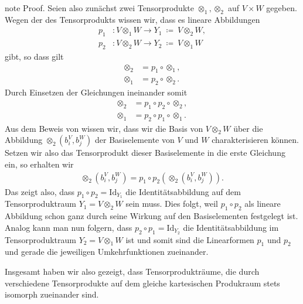 \documentclass[letterpaper,10pt,german]{jupyterBook}
\begin{document}
\begin{sphinxadmonition}{note}
\sphinxAtStartPar
Proof. Seien also zunächst zwei Tensorprodukte \(\otimes_1, \otimes_2\) auf \(V\times W\) gegeben.
Wegen der  des Tensorprodukts wissen wir, dass es lineare Abbildungen
\begin{equation*}
\begin{split}p_1&: V\otimes_1 W\to Y_1 \ \coloneqq \ V\otimes_2 W,\\
p_2&: V\otimes_2 W\to Y_2 \ \coloneqq \ V\otimes_1 W\end{split}
\end{equation*}
\sphinxAtStartPar
gibt, so dass gilt
\begin{equation*}
\begin{split}\otimes_2 &= p_1 \circ \otimes_1,\\
\otimes_1 &= p_2 \circ \otimes_2.\end{split}
\end{equation*}
\sphinxAtStartPar
Durch Einsetzen der Gleichungen ineinander somit
\begin{equation*}
\begin{split}\otimes_2 &= p_1\circ p_2 \circ \otimes_2,\\
\otimes_1 &= p_2\circ p_1 \circ \otimes_1.\end{split}
\end{equation*}
\sphinxAtStartPar
Aus dem Beweis von {\hyperref[\detokenize{vektoranalysis/tensor:thm:existenzTensorprodukt}]{}} wissen wir, dass wir die Basis von \(V\otimes_2 W\) über die Abbildung \(\otimes_2(b_i^V, b_j^W)\) der Basiselemente von \(V\) und \(W\) charakterisieren können.
Setzen wir also das Tensorprodukt dieser Basiselemente in die erste Gleichung ein, so erhalten wir
\begin{equation*}
\begin{split}\otimes_2(b_i^V, b_j^W) = p_1\circ p_2(\otimes_2(b_i^V,b_j^W)).\end{split}
\end{equation*}
\sphinxAtStartPar
Das zeigt also, dass \(p_1\circ p_2 = \mathrm{Id}_{Y_1}\) die Identitätsabbildung auf dem Tensorproduktraum \(Y_1 = V \otimes_2 W\) sein muss.
Dies folgt, weil \(p_1\circ p_2\) als lineare Abbildung schon ganz durch seine Wirkung auf den Basiselementen festgelegt ist.
Analog kann man nun folgern, dass \(p_2\circ p_1 = \mathrm{Id}_{Y_2}\) die Identitätsabbildung im Tensorproduktraum \(Y_2 = V \otimes_1 W\) ist und somit sind die Linearformen \(p_1\) und \(p_2\)  und gerade die jeweiligen Umkehrfunktionen zueinander.

\sphinxAtStartPar
Insgesamt haben wir also gezeigt, dass Tensorprodukträume, die durch verschiedene Tensorprodukte auf dem gleiche kartesischen Produkraum stets isomorph zueinander sind.
\end{sphinxadmonition}
\end{document}
